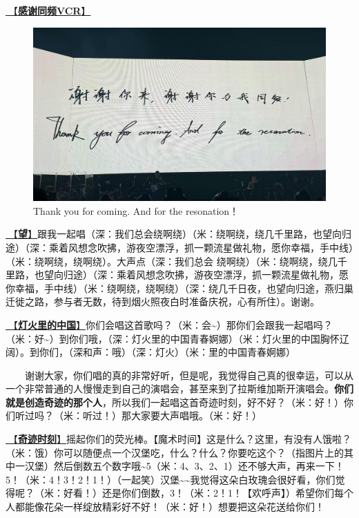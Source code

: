 \documentclass[]{ctexbook}
\begin{document}
\hyperref[thank-you-vcr]{🎥【\textbf{感谢同频VCR}】}

\begin{figure}

{\centering \includegraphics[width=400pt]{img/lasvegas20250228/thankyou} 

}

\caption{Thank you for coming. And for the resonation！}\label{fig:unnamed-chunk-176}
\end{figure}

\hyperref[Gaze]{🎵【\textbf{望}】}跟我一起唱（深：我们总会绕啊绕）（米：绕啊绕，绕几千里路，也望向归途）（深：乘着风想念吹拂，游夜空漂浮，抓一颗流星做礼物，愿你幸福，手中线）（米：绕啊绕，绕啊绕）。大声点（深：我们总会 绕啊绕）（米：绕啊绕，绕几千里路，也望向归途）（深：乘着风想念吹拂，游夜空漂浮，抓一颗流星做礼物，愿你幸福，手中线）（米：绕啊绕，绕啊绕）（深：绕几千日夜，也望向归途，燕归巢迁徙之路，参与者无数，待到烟火照夜白时准备庆祝，心有所住）。谢谢。

\hyperref[China-in-the-lights]{🎵【\textbf{灯火里的中国}】}你们会唱这首歌吗？（米：会\textasciitilde）那你们会跟我一起唱吗？（米：好\textasciitilde）到你们哦，（深：灯火里的中国青春婀娜）（米：灯火里的中国胸怀辽阔）。到你们，（深和声：哦）（深：灯火）（米：里的中国青春婀娜）

  谢谢大家，你们唱的真的非常好听，但是呢，我觉得自己真的很幸运，可以从一个非常普通的人慢慢走到自己的演唱会，甚至来到了拉斯维加斯开演唱会。\textbf{你们就是创造奇迹的那个人}，所以我们一起唱这首奇迹时刻，好不好？（米：好！）你们听过吗？（米：听过！）那大家要大声唱哦。（米：好！）

\hyperref[magic-moment]{🎵【\textbf{奇迹时刻}】}摇起你们的荧光棒。【魔术时间】这是什么？这里，有没有人饿啦？（米：饿）你可以随便点一个汉堡吃，什么？什么？你要吃这个？（指图片上的其中一汉堡）然后倒数五个数字哦\textasciitilde5（米：4、3、2、1）还不够大声，再来一下！5！（米：4！3！2！1！）（一起笑）汉堡\textasciitilde\textasciitilde 我觉得这朵白玫瑰会很好看，你们觉得呢？（米：好看！）还是你们倒数，3！（米：2！1！【欢呼声】）希望你们每个人都能像花朵一样绽放精彩好不好！（米：好！）想要把这朵花送给你们！
\end{document}
